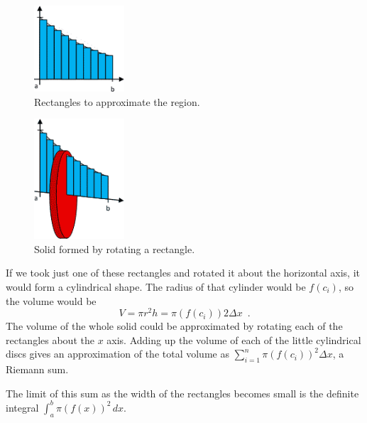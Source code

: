 \begin{figure}[!ht]
  \centering
    \includegraphics[width=0.3\textwidth]{img/chap5/image071.png}
    \caption{Rectangles to approximate the region.}
    \label{fig:5-8-region}
\end{figure}
\begin{figure}[!ht]
  \centering
    \includegraphics[width=0.3\textwidth]{img/chap5/image072.png}
    \caption{Solid formed by rotating a rectangle.}
    \label{fig:5-8-solid}
\end{figure}
If we took just one of these rectangles and rotated it about the horizontal axis, it would form a cylindrical shape. The radius of that cylinder would be $f(c_i)$, so the volume would be
$$V = \pi r^2 h = \pi(f(c_i))2\Delta x \enspace .$$
The volume of the whole solid could be approximated by rotating each of the rectangles about the $x$ axis. Adding up the volume of each of the little cylindrical discs gives an approximation of the total volume as $\displaystyle\sum_{i=1}^n \pi (f(c_i))^2\Delta x$, a Riemann sum.

The limit of this sum as the width of the rectangles becomes small is the definite integral $\displaystyle\int_a^b \pi(f(x))^2\,dx.$

